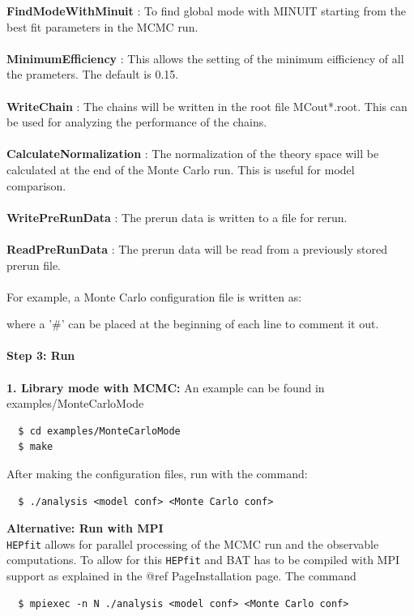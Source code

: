 \documentclass[preprint,3p,12pt]{elsarticle}
\newcommand{\HEPfit}{\texttt{HEPfit}\xspace}
\begin{document}
{{\bf FindModeWithMinuit} : To find global mode with MINUIT starting
from the best fit parameters in the MCMC run.\\\\
{\bf MinimumEfficiency}  : This allows the setting of the minimum eifficiency of 
all the prameters. The default is 0.15.\\\\
{\bf WriteChain}        : The chains will be written in the root file MCout*.root. 
This can be used for analyzing the performance of the chains.\\\\
{\bf CalculateNormalization} : The normalization of the theory space will be calculated
at the end of the Monte Carlo run. This is useful for model comparison.\\\\
{\bf WritePreRunData} : The prerun data is written to a file for rerun.      \\\\
{\bf ReadPreRunData}  : The prerun data will be read from a previously stored prerun file. \\\\
For example, a Monte Carlo configuration file is written as: 



where a '\#' can be placed at the beginning of each line to comment it out.\\\\
%
{\bf \large Step 3: Run}\\\\
%
{\bf 1. Library mode with MCMC:  }An example can be found in examples/MonteCarloMode

\begin{lstlisting}
  $ cd examples/MonteCarloMode
  $ make
\end{lstlisting}

After making the configuration files, run with the command:
\begin{lstlisting}
  $ ./analysis <model conf> <Monte Carlo conf>
\end{lstlisting}
%
{\bf Alternative: Run with MPI}\\ \HEPfit allows for parallel processing of the MCMC run and the observable computations.
To allow for this \HEPfit and BAT has to be compiled with MPI support as explained in the
@ref PageInstallation page. The command

\begin{lstlisting}
  $ mpiexec -n N ./analysis <model conf> <Monte Carlo conf>
\end{lstlisting}

}
\end{document}
